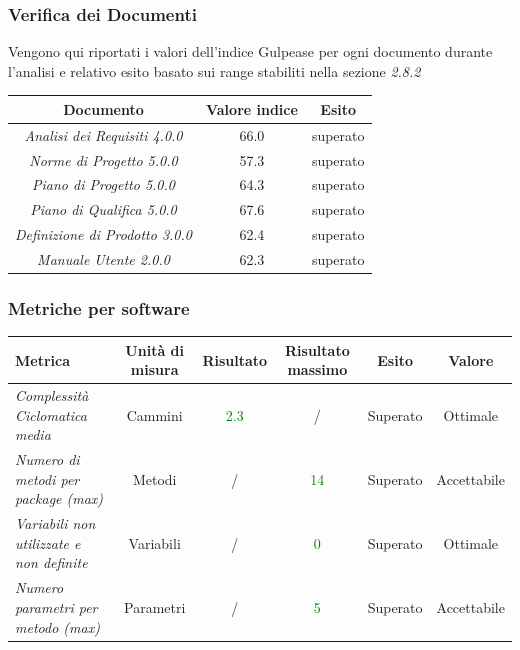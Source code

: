 {  
  
  
  \subsubsection{Verifica dei Documenti}
  Vengono qui riportati i valori dell'indice Gulpease per ogni documento durante l’analisi e relativo
  esito basato sui range stabiliti nella sezione \emph{2.8.2}
  \begin{center}
  	\begin{tabular}{|c|c|c|}
  		\hline
  		\textbf{Documento} & \textbf{Valore indice} & \textbf{Esito} \\
  		\hline
  		\emph{Analisi dei Requisiti 4.0.0}  & 66.0 & superato \\
  		\hline
  		\emph{Norme di Progetto 5.0.0}   & 57.3  & superato \\
  		\hline
  		\emph{Piano di Progetto 5.0.0}   & 64.3 & superato \\
  		\hline
  		\emph{Piano di Qualifica 5.0.0}   & 67.6 & superato \\
  		
  		\hline
  		\emph{Definizione di Prodotto 3.0.0}  & 62.4 & superato \\
  		\hline
  		\emph{Manuale Utente 2.0.0}  & 62.3 & superato \\
  		\hline
  	\end{tabular}
  \end{center}
  
  \subsubsection{Metriche per software}
  
  
  
  
  \begin{longtable}{|>{\centering}m{2cm}|c|c|c|c|c|}
  	\hline
  	\textbf{Metrica} & \textbf{Unità di misura} & \textbf{Risultato} & \textbf{Risultato massimo} & \textbf{Esito} & \textbf{Valore}\\
  	\hline
  	\endhead
  	
  	
  	\emph{Complessità Ciclomatica media} & {Cammini} & \textcolor{Green}{2.3} & / & Superato & Ottimale\\ \hline
  	\emph{Numero di metodi per package (max)} & {Metodi} & / & \textcolor{Green}{14} & Superato & Accettabile\\ \hline
  	\emph{Variabili non utilizzate e non definite} & {Variabili} & / & \textcolor{Green}{0} & Superato & Ottimale\\ \hline
  	\emph{Numero parametri per metodo (max)} & {Parametri} & / & \textcolor{Green}{5} & Superato & Accettabile\\ \hline
  	

\end{longtable}}
